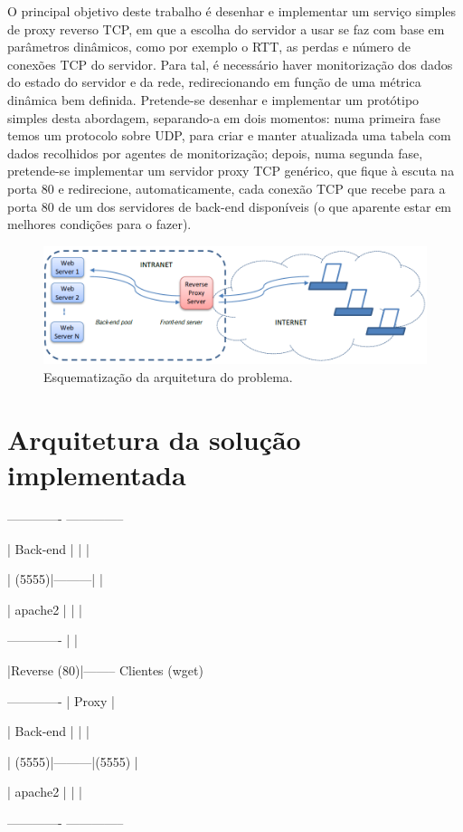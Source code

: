 \documentclass{llncs}
\begin{document}
O principal objetivo deste trabalho é desenhar e implementar um serviço simples de proxy reverso TCP, em que a escolha do servidor a usar se
faz com base em parâmetros dinâmicos, como por exemplo o RTT, as perdas e número de conexões TCP do servidor. Para tal, é necessário haver monitorização dos dados do estado do servidor e da rede, redirecionando em função de uma métrica dinâmica bem definida. Pretende-se desenhar e implementar um protótipo simples desta abordagem, separando-a em dois momentos: numa primeira fase temos um protocolo sobre UDP, para criar e manter atualizada uma tabela com dados recolhidos por agentes de monitorização; depois, numa segunda fase, pretende-se implementar um servidor proxy TCP genérico, que fique à escuta na porta 80 e redirecione, automaticamente, cada conexão TCP que recebe para a porta 80 de um dos servidores de back-end disponíveis (o que aparente estar em melhores condições para o fazer).

\begin{figure}[H]
\centering
\includegraphics[width=150mm, scale=0.5]{imagem_enunciado.PNG}
\caption{\label{fig:change}Esquematização da arquitetura do problema.}
\end{figure}

\newpage

\section{Arquitetura da solução implementada}
-------------		  --------------\par
|  Back-end |		  |            |\par
|     (5555)|---------|            |\par
|  apache2  |		  |            |\par
-------------		  |            |\par
					  |Reverse (80)|-------- Clientes (wget)\par
-------------		  |	Proxy      |\par
|  Back-end |		  |            |\par
|     (5555)|---------|(5555)      |\par
|  apache2  |		  |            |\par
-------------		  --------------\par
\end{document}
